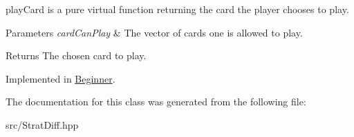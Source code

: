 play\-Card is a pure virtual function returning the card the player chooses to play. 


\begin{DoxyParams}{Parameters}
{\em card\-Can\-Play} & The vector of cards one is allowed to play. \\
\hline
\end{DoxyParams}
\begin{DoxyReturn}{Returns}
The chosen card to play. 
\end{DoxyReturn}


Implemented in \hyperlink{classBeginner_a73e2bf8d807166c994c42fd3b6bfc7bf}{Beginner}.



The documentation for this class was generated from the following file\-:\begin{DoxyCompactItemize}
\item 
src/Strat\-Diff.\-hpp\end{DoxyCompactItemize}
